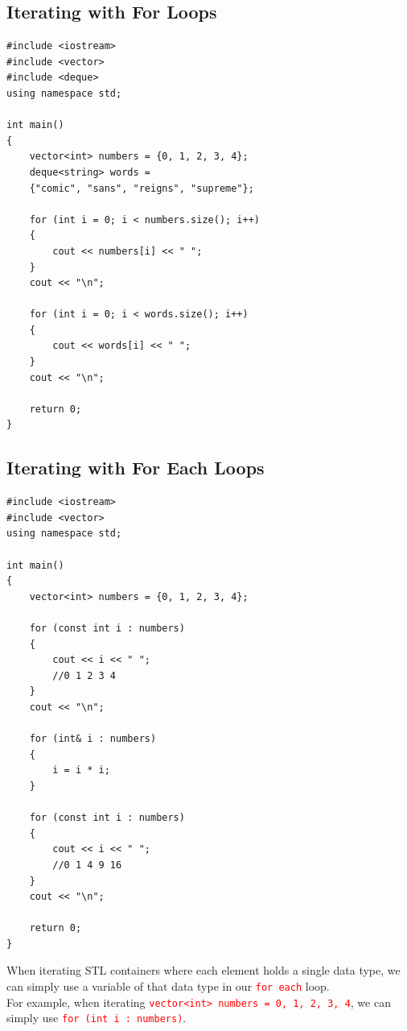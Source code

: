 \documentclass[12pt]{article}
\begin{document}
\newpage
{}
\subsection*{Iterating with For Loops}

\begin{verbatim}
#include <iostream>
#include <vector>
#include <deque>
using namespace std;

int main()
{
    vector<int> numbers = {0, 1, 2, 3, 4};
    deque<string> words = 
    {"comic", "sans", "reigns", "supreme"};

    for (int i = 0; i < numbers.size(); i++)
    {
        cout << numbers[i] << " ";
    }
    cout << "\n";

    for (int i = 0; i < words.size(); i++)
    {
        cout << words[i] << " ";
    }
    cout << "\n";

    return 0;
}
\end{verbatim}

\newpage
{}
\subsection*{Iterating with For Each Loops}

\begin{verbatim}
#include <iostream>
#include <vector>
using namespace std;

int main()
{
    vector<int> numbers = {0, 1, 2, 3, 4};

    for (const int i : numbers)
    {
        cout << i << " ";
        //0 1 2 3 4
    }
    cout << "\n";

    for (int& i : numbers)
    {
        i = i * i;
    }

    for (const int i : numbers)
    {
        cout << i << " ";
        //0 1 4 9 16
    }
    cout << "\n";

    return 0;
}
\end{verbatim}

\newpage

\noindent When iterating STL containers where each element holds a single data type, we can simply use a variable of that data type in our \textcolor{red}{\texttt{for each}} loop. \\

\noindent For example, when iterating \textcolor{red}{\texttt{vector<int> numbers = {0, 1, 2, 3, 4}}}, we can simply use \textcolor{red}{\texttt{for (int i : numbers)}}. \\
\end{document}
